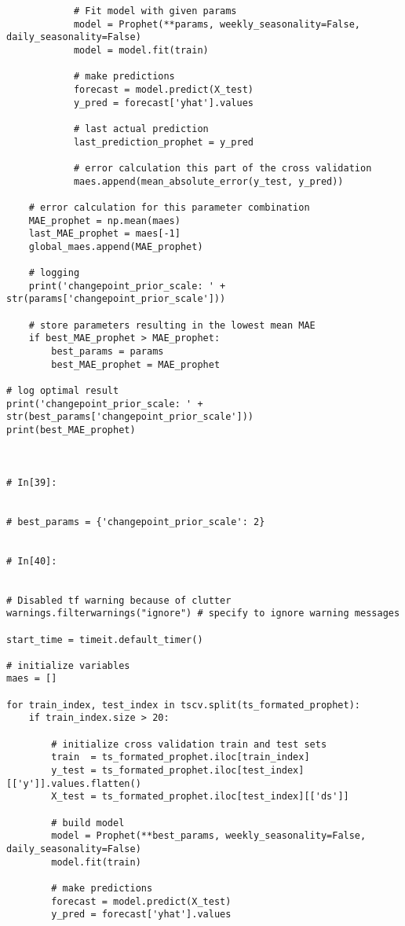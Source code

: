 \begin{verbatim}
            # Fit model with given params
            model = Prophet(**params, weekly_seasonality=False, daily_seasonality=False)
            model = model.fit(train)
            
            # make predictions
            forecast = model.predict(X_test)
            y_pred = forecast['yhat'].values
            
            # last actual prediction 
            last_prediction_prophet = y_pred
            
            # error calculation this part of the cross validation
            maes.append(mean_absolute_error(y_test, y_pred))
            
    # error calculation for this parameter combination
    MAE_prophet = np.mean(maes)
    last_MAE_prophet = maes[-1]
    global_maes.append(MAE_prophet)
    
    # logging
    print('changepoint_prior_scale: ' + str(params['changepoint_prior_scale']))
    
    # store parameters resulting in the lowest mean MAE
    if best_MAE_prophet > MAE_prophet:
        best_params = params
        best_MAE_prophet = MAE_prophet

# log optimal result          
print('changepoint_prior_scale: ' + str(best_params['changepoint_prior_scale']))
print(best_MAE_prophet)
            


# In[39]:


# best_params = {'changepoint_prior_scale': 2}


# In[40]:


# Disabled tf warning because of clutter
warnings.filterwarnings("ignore") # specify to ignore warning messages

start_time = timeit.default_timer()

# initialize variables
maes = []

for train_index, test_index in tscv.split(ts_formated_prophet):
    if train_index.size > 20:  
        
        # initialize cross validation train and test sets
        train  = ts_formated_prophet.iloc[train_index]
        y_test = ts_formated_prophet.iloc[test_index][['y']].values.flatten()
        X_test = ts_formated_prophet.iloc[test_index][['ds']]

        # build model
        model = Prophet(**best_params, weekly_seasonality=False, daily_seasonality=False)
        model.fit(train)

        # make predictions
        forecast = model.predict(X_test)
        y_pred = forecast['yhat'].values


\end{verbatim}
